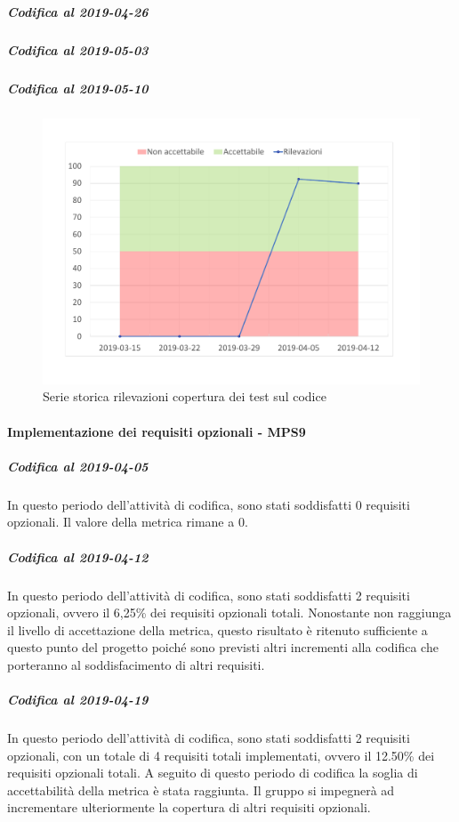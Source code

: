 \subparagraph{Codifica al 2019-04-26}

\subparagraph{Codifica al 2019-05-03}

\subparagraph{Codifica al 2019-05-10}

\begin{figure}[H]
	\centering
	\includegraphics[scale=0.6]{images/resoconto/MPS8Chart.pdf}
	\caption{Serie storica rilevazioni copertura dei test sul codice}	
\end{figure}


\paragraph{Implementazione dei requisiti opzionali - MPS9}
\subparagraph{Codifica al 2019-04-05}
In questo periodo dell'attività di codifica, sono stati soddisfatti 0 requisiti opzionali. Il valore della metrica rimane a 0.

\subparagraph{Codifica al 2019-04-12}
In questo periodo dell'attività di codifica, sono stati soddisfatti 2 requisiti opzionali, ovvero il 6,25\% dei requisiti opzionali totali.
Nonostante non raggiunga il livello di accettazione della
metrica, questo risultato è ritenuto sufficiente a questo punto del progetto poiché sono previsti altri incrementi alla codifica che porteranno al soddisfacimento di altri requisiti.

\subparagraph{Codifica al 2019-04-19}
In questo periodo dell'attività di codifica, sono stati soddisfatti 2 requisiti opzionali, con un totale di 4 requisiti totali implementati, ovvero il 12.50\% dei requisiti opzionali totali.
A seguito di questo periodo di codifica la soglia di accettabilità della metrica è stata raggiunta.
Il gruppo si impegnerà ad incrementare ulteriormente la copertura di altri requisiti opzionali.

